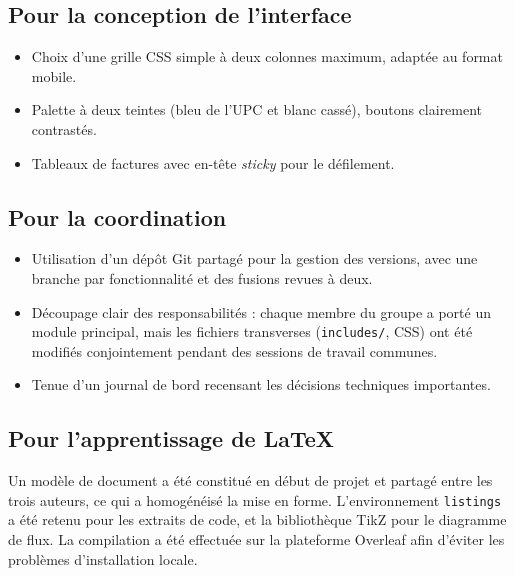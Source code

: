 \documentclass[12pt,a4paper]{article}
\begin{document}
\subsection{Pour la conception de l'interface}

\begin{itemize}[leftmargin=1.5em]
    \item Choix d'une grille CSS simple à deux colonnes maximum, adaptée au format mobile.
    \item Palette à deux teintes (bleu de l'UPC et blanc cassé), boutons clairement contrastés.
    \item Tableaux de factures avec en-tête \textit{sticky} pour le défilement.
\end{itemize}

\subsection{Pour la coordination}

\begin{itemize}[leftmargin=1.5em]
    \item Utilisation d'un dépôt Git partagé pour la gestion des versions, avec une branche par fonctionnalité et des fusions revues à deux.
    \item Découpage clair des responsabilités : chaque membre du groupe a porté un module principal, mais les fichiers transverses (\texttt{includes/}, CSS) ont été modifiés conjointement pendant des sessions de travail communes.
    \item Tenue d'un journal de bord recensant les décisions techniques importantes.
\end{itemize}

\subsection{Pour l'apprentissage de \LaTeX{}}

Un modèle de document a été constitué en début de projet et partagé entre les trois auteurs, ce qui a homogénéisé la mise en forme. L'environnement \texttt{listings} a été retenu pour les extraits de code, et la bibliothèque TikZ pour le diagramme de flux. La compilation a été effectuée sur la plateforme Overleaf afin d'éviter les problèmes d'installation locale.

\end{document}
